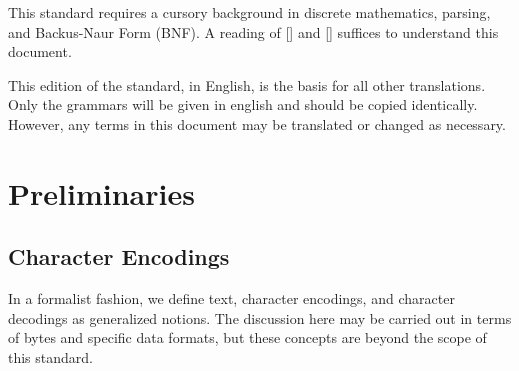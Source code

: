 

This standard requires a cursory background in discrete mathematics, parsing, and Backus-Naur Form (BNF). A reading of [] and [] suffices to understand this document.

This edition of the standard, in English, is the basis for all other translations. Only the grammars will be given in english and should be copied identically. However, any terms in this document may be translated or changed as necessary.

\section{Preliminaries}

\newcommand*{\chars}{\mathrm{CHAR}}
\newcommand*{\numbers}{\mathrm{NUMBER}}
\newcommand*{\whitespaces}{\mathrm{WHITE\_SPACES}}
\newcommand*{\reserved}{\mathrm{RESERVED}}
\newcommand*{\strings}{\mathrm{STRING}}
\newcommand*{\term}{\mathrm{term}}
\newcommand*{\terms}{\mathrm{terms}}
\newcommand*{\delimiters}{\mathrm{DELIMITERS}}
\newcommand*{\escapes}{\mathrm{ESCAPE}}
\newcommand*{\encoding}{\mathcal{E}}
\newcommand*{\decoding}{\mathcal{D}}


\newcommand*{\scope}{\textrm{scope}}


\subsection{Character Encodings}
In a formalist fashion, we define text, character encodings, and character decodings as generalized notions. The discussion here may be carried out in terms of bytes and specific data formats, but these concepts are beyond the scope of this standard.

